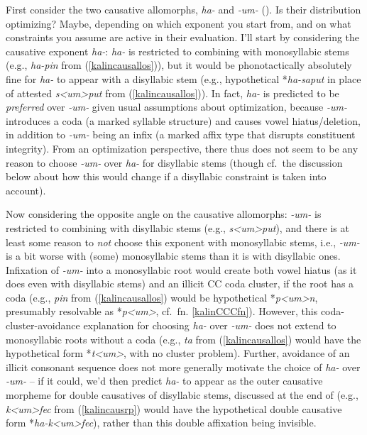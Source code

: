 \documentclass[output=paper]{langscibook}
\begin{document}
First consider the two causative allomorphs, \textit{ha-} and \textit{-um-} (). Is their distribution optimizing? Maybe, depending on which exponent you start from, and on what constraints you assume are active in their evaluation. I'll start by considering the causative exponent \textit{ha-}: \textit{ha-} is restricted to combining with monosyllabic stems (e.g., \textit{ha-pin} from (\ref{kalincausallos})), but it would be phonotactically absolutely fine for  \textit{ha-} to appear with a disyllabic stem (e.g., hypothetical *\textit{ha-saput} in place of attested \textit{s<um>put} from (\ref{kalincausallos})). In fact, \textit{ha-} is predicted to be \textit{preferred} over \textit{-um-} given usual assumptions about optimization, because \textit{-um-} introduces a coda (a marked syllable structure) and causes vowel hiatus/deletion, in addition to \textit{-um-}  being an infix (a marked affix type that disrupts constituent integrity). From an optimization perspective, there thus does not seem to be any reason to choose \textit{-um-} over \textit{ha-} for disyllabic stems (though cf.\ the discussion below about how this would change if a disyllabic constraint is taken into account).

Now considering the opposite angle on the causative allomorphs: \textit{-um-} is restricted to combining with disyllabic stems (e.g., \textit{s<um>put}), and there is at least some reason to \textit{not} choose this exponent with monosyllabic stems, i.e., \textit{-um-} is a bit worse with (some) monosyllabic stems than it is with disyllabic ones. Infixation of \textit{-um-} into a monosyllabic root would create both vowel hiatus (as it does even with disyllabic stems) and an illicit CC coda cluster, if the root has a coda (e.g., \textit{pin} from (\ref{kalincausallos}) would be hypothetical *\textit{p<um>n}, presumably resolvable as *\textit{p<um>}, cf.\ fn. \ref{kalinCCCfn}). However, this coda-cluster-avoidance explanation for choosing \textit{ha-} over \textit{-um-} does not extend to monosyllabic roots without a coda (e.g., \textit{ta} from (\ref{kalincausallos}) would have the hypothetical form *\textit{t<um>}, with no cluster problem). Further, avoidance of an illicit consonant sequence does not more generally motivate the choice of \textit{ha-} over \textit{-um-} -- if it could, we'd then predict \textit{ha-} to appear as the outer causative morpheme for double causatives of disyllabic stems, discussed at the end of  (e.g., \textit{k<um>fec} from (\ref{kalincausrp}) would have the hypothetical double causative form *\textit{ha-k<um>fec}), rather than this double affixation being invisible.
\end{document}
